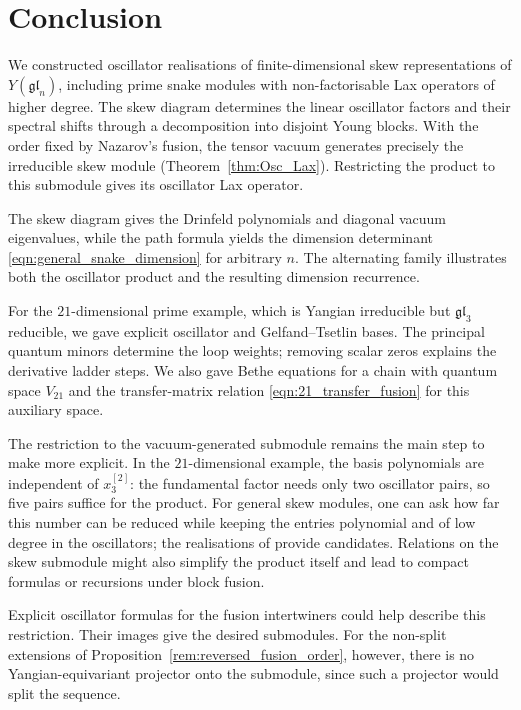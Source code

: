\documentclass[12pt,reqno]{amsart}
\numberwithin{equation}{section}
\begin{document}
\section{Conclusion}
\label{sect:conclusion}

We constructed oscillator realisations of finite-dimensional skew
representations of $Y(\mathfrak{gl}_n)$, including prime snake
modules with non-factorisable Lax operators of higher degree.
The skew diagram determines the linear oscillator factors and
their spectral shifts through a decomposition into disjoint Young
blocks. With the order fixed by Nazarov's fusion, the tensor vacuum
generates precisely the irreducible skew module
(Theorem~\ref{thm:Osc_Lax}). Restricting the product to this
submodule gives its oscillator Lax operator.

The skew diagram gives the Drinfeld polynomials and diagonal
vacuum eigenvalues, while the path formula yields the dimension
determinant \eqref{eqn:general_snake_dimension} for arbitrary $n$.
The alternating family illustrates both the oscillator product
and the resulting dimension recurrence.

For the $21$-dimensional prime example, which is Yangian
irreducible but $\mathfrak{gl}_3$ reducible, we gave explicit
oscillator and Gelfand--Tsetlin bases. The principal quantum
minors determine the loop weights; removing scalar zeros explains
the derivative ladder steps. We also gave Bethe equations for
a chain with quantum space $V_{21}$ and the transfer-matrix
relation \eqref{eqn:21_transfer_fusion} for this auxiliary space.

The restriction to the vacuum-generated submodule remains the main
step to make more explicit. In the $21$-dimensional example,
the basis polynomials are independent of $x_3^{[2]}$:
the fundamental factor needs only two oscillator pairs, so five
pairs suffice for the product. For general skew modules, one can
ask how far this number can be reduced while keeping the entries
polynomial and of low degree in the oscillators; the realisations
of \cite{Frassek:2018try,Frassek:2020lky} provide candidates.
Relations on the skew submodule might also simplify the product
itself and lead to compact formulas or recursions under block fusion.

Explicit oscillator formulas for the fusion intertwiners could
help describe this restriction. Their images give the desired
submodules. For the non-split extensions of
Proposition~\ref{rem:reversed_fusion_order}, however, there is no
Yangian-equivariant projector onto the submodule, since such a
projector would split the sequence.
\end{document}
